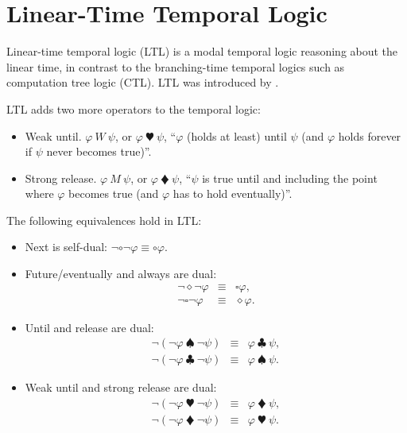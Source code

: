 \section{Linear-Time Temporal Logic}

Linear-time temporal logic (LTL) is a modal temporal logic reasoning about the linear time, in contrast to the branching-time temporal logics such as computation tree logic (CTL). LTL was introduced by \cite{DBLP:conf/focs/Pnueli77}.

LTL adds two more operators to the temporal logic:
\begin{itemize}
    \item Weak until. $\varphi~W~\psi$, or $\varphi~\varheartsuit~\psi$, ``$\varphi$ (holds at least) until $\psi$ (and $\varphi$ holds forever if $\psi$ never becomes true)''.
    \item Strong release. $\varphi~M~\psi$, or $\varphi~\vardiamondsuit~\psi$, ``$\psi$ is true until and including the point where $\varphi$ becomes true (and $\varphi$ has to hold eventually)''.
\end{itemize}

The following equivalences hold in LTL:
\begin{itemize}
    \item Next is self-dual: $\neg\circ\neg\varphi \equiv \circ\varphi$.
    \item Future/eventually and always are dual:
    \begin{eqnarray*}
    \neg\diamond\neg\varphi &\equiv& \square\varphi, \\
    \neg\square\neg\varphi &\equiv& \diamond\varphi.
    \end{eqnarray*}
    \item Until and release are dual: 
    \begin{eqnarray*}
    \neg(\neg\varphi~\spadesuit~\neg\psi) &\equiv& \varphi~\clubsuit~\psi, \\
    \neg(\neg\varphi~\clubsuit~\neg\psi) &\equiv& \varphi~\spadesuit~\psi.
    \end{eqnarray*}
    \item Weak until and strong release are dual: 
    \begin{eqnarray*}
    \neg(\neg\varphi~\varheartsuit~\neg\psi) &\equiv& \varphi~\vardiamondsuit~\psi, \\
    \neg(\neg\varphi~\vardiamondsuit~\neg\psi) &\equiv& \varphi~\varheartsuit~\psi.
    \end{eqnarray*}
\end{itemize}

